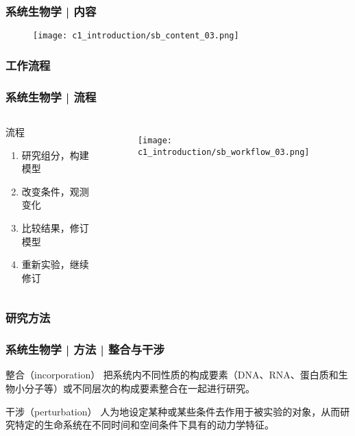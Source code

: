 \begin{frame}
  \frametitle{系统生物学 | 内容}
  \begin{figure}
    \centering
    \texttt{[image: c1\_introduction/sb\_content\_03.png]}
  \end{figure}
\end{frame}

\subsubsection{工作流程}
\begin{frame}
  \frametitle{系统生物学 | 流程}
  \begin{columns}
    \begin{block}{流程}
  \begin{enumerate}
    \item 研究组分，构建模型
    \item 改变条件，观测变化
    \item 比较结果，修订模型
    \item 重新实验，继续修订
  \end{enumerate}
    \end{block}
  \begin{figure}
    \centering
    \texttt{[image: c1\_introduction/sb\_workflow\_03.png]}
  \end{figure}
  \end{columns}
\end{frame}

\subsubsection{研究方法}
\begin{frame}
  \frametitle{系统生物学 | 方法 | 整合与干涉}
  \begin{block}{整合（incorporation）}
把系统内不同性质的构成要素（DNA、RNA、蛋白质和生物小分子等）或不同层次的构成要素整合在一起进行研究。
  \end{block}
  \pause
  \begin{block}{干涉（perturbation）}
人为地设定某种或某些条件去作用于被实验的对象，从而研究特定的生命系统在不同时间和空间条件下具有的动力学特征。
  \end{block}
\end{frame}

